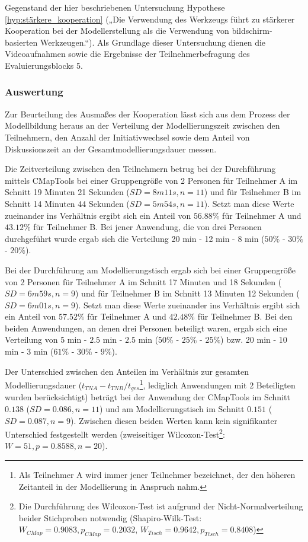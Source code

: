 Gegenstand der hier beschriebenen Untersuchung Hypothese \ref{hyp:stärkere_kooperation} („Die Verwendung des Werkzeugs führt zu stärkerer Kooperation bei der Modellerstellung als die Verwendung von bildschirm-basierten Werkzeugen.“). Als Grundlage dieser Untersuchung dienen die Videoaufnahmen sowie die Ergebnisse der Teilnehmerbefragung des Evaluierungsblocks 5.

\subsubsection{Auswertung} %

Zur Beurteilung des Ausmaßes der Kooperation lässt sich aus dem Prozess der Modellbildung heraus an der Verteilung der Modellierungszeit zwischen den Teilnehmern, den Anzahl der Initiativwechsel sowie dem Anteil von Diskussionszeit an der Gesamtmodellierungsdauer messen.

Die Zeitverteilung zwischen den Teilnehmern betrug bei der Durchführung mittels CMapTools bei einer Gruppengröße von 2 Personen für Teilnehmer A im Schnitt 19 Minuten 21 Sekunden ($SD=8m11s, n=11$) und für Teilnehmer B im Schnitt 14 Minuten 44 Sekunden ($SD=5m54s, n=11$). Setzt man diese Werte zueinander ins Verhältnis ergibt sich ein Anteil von $56.88\%$ für Teilnehmer A und $43.12\%$ für Teilnehmer B. Bei jener Anwendung, die von drei Personen durchgeführt wurde ergab sich die Verteilung 20 min - 12 min - 8 min ($50\%$ - $30\%$ - $20\%$). 

Bei der Durchführung am Modellierungstisch ergab sich bei einer Gruppengröße von 2 Personen für Teilnehmer A im Schnitt 17 Minuten und 18 Sekunden ($SD=6m59s, n=9$) und für Teilnehmer B im Schnitt 13 Minuten 12 Sekunden ($SD=6m01s, n=9$). Setzt man diese Werte zueinander ins Verhältnis ergibt sich ein Anteil von $57.52\%$ für Teilnehmer A und $42.48\%$ für Teilnehmer B. Bei den beiden Anwendungen, an denen drei Personen beteiligt waren, ergab sich eine Verteilung von 5 min - $2.5$ min - $2.5$ min ($50\%$ - $25\%$ - $25\%$) bzw. 20 min - 10 min - 3 min ($61\%$ - $30\%$ - $9\%$). 

Der Unterschied zwischen den Anteilen im Verhältnis zur gesamten Modellierungsdauer (${t_{TN A} - t_{TN B}}/t_{ges}$\footnote{Als Teilnehmer A wird immer jener Teilnehmer bezeichnet, der den höheren Zeitanteil in der Modellierung in Anspruch nahm.}, lediglich Anwendungen mit 2 Beteiligten wurden berücksichtigt) beträgt bei der Anwendung der CMapTools im Schnitt $0.138$ ($SD=0.086, n=11$) und am Modellierungstisch im Schnitt $0.151$ ($SD=0.087, n=9$). Zwischen diesen beiden Werten kann kein signifikanter Unterschied festgestellt werden (zweiseitiger Wilcoxon-Test\footnote{Die Durchführung des Wilcoxon-Test ist aufgrund der Nicht-Normalverteilung beider Stichproben notwendig (Shapiro-Wilk-Test: $W_{CMap} = 0.9083, p_{CMap} = 0.2032$, $W_{Tisch}= 0.9642, p_{Tisch} = 0.8408$)}: $W=51, p=0.8588, n=20$).

